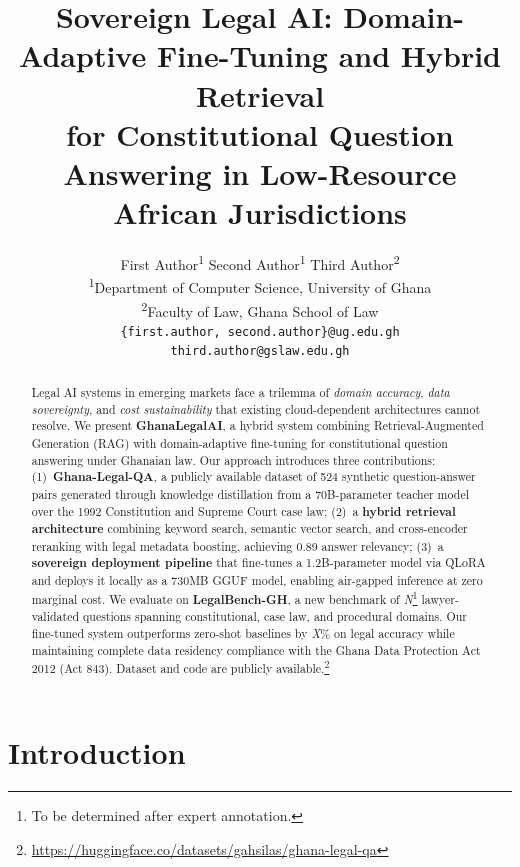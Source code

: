 \documentclass[11pt]{article}
\title{Sovereign Legal AI: Domain-Adaptive Fine-Tuning and Hybrid Retrieval \\
for Constitutional Question Answering in Low-Resource African Jurisdictions}
\author{
  First Author\textsuperscript{1} \quad
  Second Author\textsuperscript{1} \quad
  Third Author\textsuperscript{2} \\
  \textsuperscript{1}Department of Computer Science, University of Ghana \\
  \textsuperscript{2}Faculty of Law, Ghana School of Law \\
  \texttt{\{first.author, second.author\}@ug.edu.gh} \\
  \texttt{third.author@gslaw.edu.gh}
}
\date{}
\begin{document}
\maketitle

\begin{abstract}
Legal AI systems in emerging markets face a trilemma of \textit{domain accuracy},
\textit{data sovereignty}, and \textit{cost sustainability} that existing
cloud-dependent architectures cannot resolve. We present \textbf{GhanaLegalAI},
a hybrid system combining Retrieval-Augmented Generation (RAG) with
domain-adaptive fine-tuning for constitutional question answering under
Ghanaian law. Our approach introduces three contributions:
%
(1)~\textbf{Ghana-Legal-QA}, a publicly available dataset of 524 synthetic
question-answer pairs generated through knowledge distillation from a
70B-parameter teacher model over the 1992 Constitution and Supreme Court
case law;
%
(2)~a \textbf{hybrid retrieval architecture} combining keyword search,
semantic vector search, and cross-encoder reranking with legal metadata
boosting, achieving 0.89 answer relevancy;
%
(3)~a \textbf{sovereign deployment pipeline} that fine-tunes a 1.2B-parameter
model via QLoRA and deploys it locally as a 730MB GGUF model, enabling
air-gapped inference at zero marginal cost.
%
We evaluate on \textbf{LegalBench-GH}, a new benchmark of
\textit{N}\footnote{To be determined after expert annotation.}
lawyer-validated questions spanning constitutional, case law, and procedural
domains. Our fine-tuned system outperforms zero-shot baselines by
\textit{X}\% on legal accuracy while maintaining complete data residency
compliance with the Ghana Data Protection Act 2012 (Act 843).
%
Dataset and code are publicly available.\footnote{\url{https://huggingface.co/datasets/gahsilas/ghana-legal-qa}}

\end{abstract}

\section{Introduction}
\label{sec:introduction}

\end{document}
